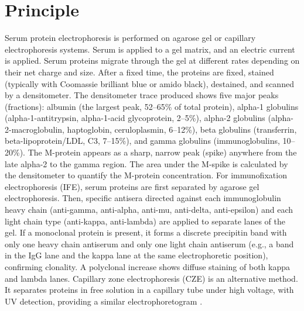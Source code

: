 \section*{Principle}
Serum protein electrophoresis is performed on agarose gel or capillary electrophoresis systems. Serum is applied to a gel matrix, and an electric current is applied. Serum proteins migrate through the gel at different rates depending on their net charge and size. After a fixed time, the proteins are fixed, stained (typically with Coomassie brilliant blue or amido black), destained, and scanned by a densitometer. The densitometer trace produced shows five major peaks (fractions): albumin (the largest peak, 52--65\% of total protein), alpha-1 globulins (alpha-1-antitrypsin, alpha-1-acid glycoprotein, 2--5\%), alpha-2 globulins (alpha-2-macroglobulin, haptoglobin, ceruloplasmin, 6--12\%), beta globulins (transferrin, beta-lipoprotein/LDL, C3, 7--15\%), and gamma globulins (immunoglobulins, 10--20\%). The M-protein appears as a sharp, narrow peak (spike) anywhere from the late alpha-2 to the gamma region. The area under the M-spike is calculated by the densitometer to quantify the M-protein concentration. For immunofixation electrophoresis (IFE), serum proteins are first separated by agarose gel electrophoresis. Then, specific antisera directed against each immunoglobulin heavy chain (anti-gamma, anti-alpha, anti-mu, anti-delta, anti-epsilon) and each light chain type (anti-kappa, anti-lambda) are applied to separate lanes of the gel. If a monoclonal protein is present, it forms a discrete precipitin band with only one heavy chain antiserum and only one light chain antiserum (e.g., a band in the IgG lane and the kappa lane at the same electrophoretic position), confirming clonality. A polyclonal increase shows diffuse staining of both kappa and lambda lanes. Capillary zone electrophoresis (CZE) is an alternative method. It separates proteins in free solution in a capillary tube under high voltage, with UV detection, providing a similar electrophoretogram \cite{dispenzieri2009standardization}.

